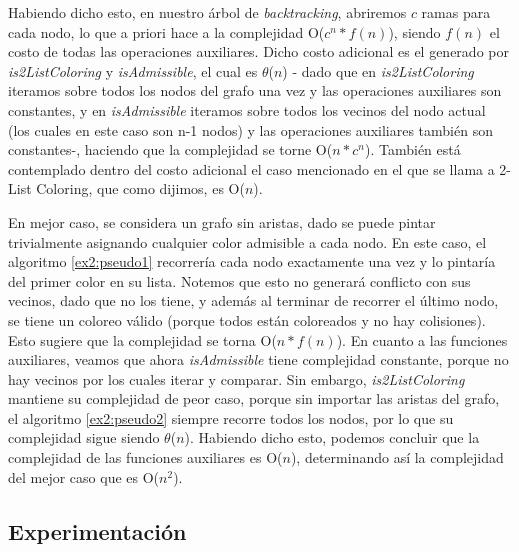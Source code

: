 \documentclass{article}
\theoremstyle{definition}
\theoremstyle{remark}
\begin{document}
Habiendo dicho esto, en nuestro árbol de \textit{backtracking}, abriremos $c$ ramas para cada nodo, lo que a priori hace a la complejidad O($c^{n}*f(n)$), siendo $f(n)$ el costo de todas las operaciones auxiliares. Dicho costo adicional es el generado por \textit{is2ListColoring} y \textit{isAdmissible}, el cual es $\theta$($n$) - dado que en \textit{is2ListColoring} iteramos sobre todos los nodos del grafo una vez y las operaciones auxiliares son constantes, y en \textit{isAdmissible} iteramos sobre todos los vecinos del nodo actual (los cuales en este caso son n-1 nodos) y las operaciones auxiliares también son constantes-, haciendo que la complejidad se torne O($n*c^{n}$). También está contemplado dentro del costo adicional el caso mencionado en el que se llama a 2-List Coloring, que como dijimos, es O($n$).

En mejor caso, se considera un grafo sin aristas, dado se puede pintar trivialmente asignando cualquier color admisible a cada nodo. En este caso, el algoritmo \ref{ex2:pseudo1} recorrería cada nodo exactamente una vez y lo pintaría del primer color en su lista. Notemos que esto no generará conflicto con sus vecinos, dado que no los tiene, y además al terminar de recorrer el último nodo, se tiene un coloreo válido (porque todos están coloreados y no hay colisiones). Esto sugiere que la complejidad se torna O($n*f(n)$).
En cuanto a las funciones auxiliares, veamos que ahora \textit{isAdmissible} tiene complejidad constante, porque no hay vecinos por los cuales iterar y comparar. Sin embargo, \textit{is2ListColoring} mantiene su complejidad de peor caso, porque sin importar las aristas del grafo, el algoritmo \ref{ex2:pseudo2} siempre recorre todos los nodos, por lo que su complejidad sigue siendo $\theta$($n$). Habiendo dicho esto, podemos concluir que la complejidad de las funciones auxiliares es O($n$), determinando así la complejidad del mejor caso que es O($n^{2}$).

\subsection{Experimentación}
\end{document}
